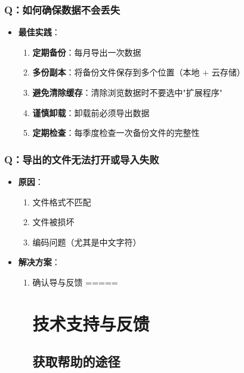 \documentclass[10pt,a4paper]{article}
\begin{document}
\begin{itemize}
\begin{itemize}
\begin{itemize}
\subsubsection{Q：如何确保数据不会丢失}

\begin{itemize}
  \item \textbf{最佳实践}：
    \begin{enumerate}
      \item \textbf{定期备份}：每月导出一次数据
      \item \textbf{多份副本}：将备份文件保存到多个位置（本地 + 云存储）
      \item \textbf{避免清除缓存}：清除浏览数据时不要选中"扩展程序"
      \item \textbf{谨慎卸载}：卸载前必须导出数据
      \item \textbf{定期检查}：每季度检查一次备份文件的完整性
    \end{enumerate}
\end{itemize}

\subsubsection{Q：导出的文件无法打开或导入失败}

\begin{itemize}
  \item \textbf{原因}：
    \begin{enumerate}
      \item 文件格式不匹配
      \item 文件被损坏
      \item 编码问题（尤其是中文字符）
    \end{enumerate}
  \item \textbf{解决方案}：
    \begin{enumerate}
      \item 确认导与反馈 =====
\section{技术支持与反馈}

\subsection{获取帮助的途径}


\end{enumerate}
\end{itemize}
\end{itemize}
\end{itemize}
\end{itemize}
\end{document}
